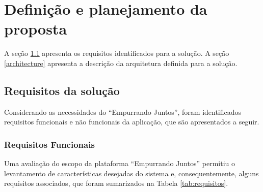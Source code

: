 \chapter{Definição e planejamento da proposta} \label{cap:proposta}

 A seção \ref{requirements} apresenta os requisitos identificados para a solução.
 A seção \ref{architecture} apresenta a descrição da arquitetura definida para a solução.

\section{Requisitos da solução} \label{requirements}

    Considerando as necessidades do ``Empurrando Juntos'',
    foram identificados requisitos funcionais e não funcionais da aplicação,
    que são apresentados a seguir.

    \subsection*{Requisitos Funcionais} \label{functional_requirements}

    Uma avaliação do escopo da plataforma ``Empurrando Juntos'' permitiu o levantamento de características desejadas do sistema e,
    consequentemente, alguns requisitos associados, que foram sumarizados na Tabela \ref{tab:requisitos}.

